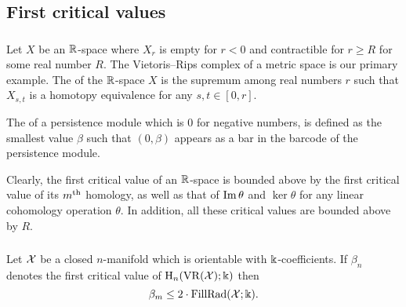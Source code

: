 
\subsection{First critical values}\label{sub:general_barcodes}


\subsubsection{}\label{subsub:first_critical_value}\label{subsub:beta v.s. fillrad}

Let $X$ be an $\mathbb{R}$-space where $X_r$ is empty for $r<0$ and contractible for $r \geq R$ for some real number $R$.
The Vietoris--Rips complex of a metric space is our primary example.
The  of the $\mathbb{R}$-space $X$ is the supremum among real numbers $r$ such that $X_{s,t}$ is a homotopy equivalence for any $s,t \in [0,r]$. 


The  of a persistence module which is \(0\) for negative numbers, is defined as the smallest value \(\beta\) such that \((0, \beta)\) appears as a bar in the barcode of the persistence module.

Clearly, the first critical value of an $\mathbb{R}$-space is bounded above by the first critical value of its $m^{\mathrm{th}}$ homology, as well as that of \(\operatorname{Im}\theta\) and \(\ker\theta\) for any linear cohomology operation $\theta$.
In addition, all these critical values are bounded above by $R$.

\subsubsection{}\label{l:crit_val and fill_rad 1}

\lemma Let $\mathcal{X}$ be a closed $n$-manifold which is orientable with \(\Bbbk\)-coefficients.
If \(\beta_n\) denotes the first critical value of \(\mathrm{H}_n(\operatorname{VR}(\mathcal{X}); \Bbbk)\) then
\[
\beta_m \leq 2 \cdot \operatorname{FillRad}(\mathcal{X}; \Bbbk).
\]

